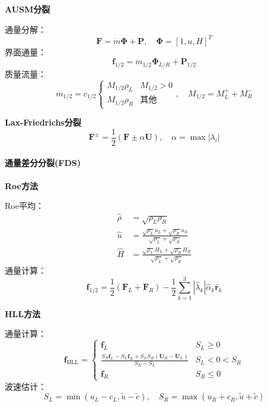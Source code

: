 \documentclass[UTF8]{ctexart}
\begin{document}
\textbf{AUSM分裂}

通量分解：
\begin{equation}
\mathbf{F} = \dot{m}\mathbf{\Phi} + \mathbf{P}, \quad \mathbf{\Phi} = [1, u, H]^T
\end{equation}
界面通量：
\begin{equation}
\mathbf{f}_{1/2} = \dot{m}_{1/2}\mathbf{\Phi}_{L/R} + \mathbf{P}_{1/2}
\end{equation}
质量流量：
\begin{equation}
\dot{m}_{1/2} = c_{1/2} \begin{cases}
M_{1/2} \rho_L & M_{1/2} > 0 \\
M_{1/2} \rho_R & \text{其他}
\end{cases}, \quad M_{1/2} = M_L^+ + M_R^-
\end{equation}

\textbf{Lax-Friedrichs分裂}
\begin{equation}
\mathbf{F}^\pm = \frac{1}{2} (\mathbf{F} \pm \alpha \mathbf{U}), \quad \alpha = \max|\lambda_i|
\end{equation}

\paragraph{通量差分分裂(FDS)}

\textbf{Roe方法}

Roe平均：
\begin{align}
\hat{\rho} &= \sqrt{\rho_L \rho_R} \\
\hat{u} &= \frac{\sqrt{\rho_L}u_L + \sqrt{\rho_R}u_R}{\sqrt{\rho_L} + \sqrt{\rho_R}} \\
\hat{H} &= \frac{\sqrt{\rho_L}H_L + \sqrt{\rho_R}H_R}{\sqrt{\rho_L} + \sqrt{\rho_R}}
\end{align}
通量计算：
\begin{equation}
\mathbf{f}_{1/2} = \frac{1}{2} \left( \mathbf{F}_L + \mathbf{F}_R \right) - \frac{1}{2} \sum_{k=1}^{3} |\hat{\lambda}_k| \hat{\alpha}_k \hat{\mathbf{r}}_k
\end{equation}

\textbf{HLL方法}

通量计算：
\begin{equation}
\mathbf{f}_{\text{HLL}} = \begin{cases} 
\mathbf{f}_L & S_L \geq 0 \\
\frac{S_R\mathbf{f}_L - S_L\mathbf{f}_R + S_LS_R(\mathbf{U}_R - \mathbf{U}_L)}{S_R - S_L} & S_L < 0 < S_R \\
\mathbf{f}_R & S_R \leq 0
\end{cases}
\end{equation}
波速估计：
\begin{equation}
S_L = \min(u_L - c_L, \tilde{u} - \tilde{c}), \quad S_R = \max(u_R + c_R, \tilde{u} + \tilde{c})
\end{equation}
\end{document}
